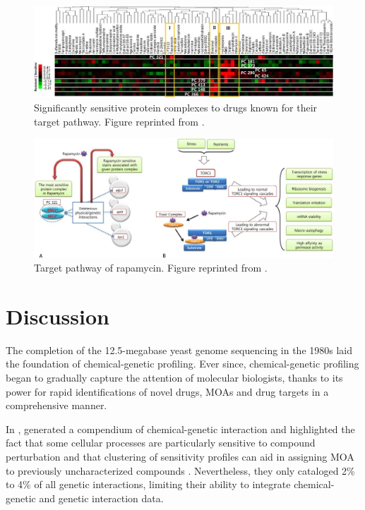 \documentclass[12pt,fullpage,singlespace]{article}
\begin{document}
\begin{figure}
\centering
\includegraphics[width=\linewidth]{1079-4.png}
\caption{Significantly sensitive protein complexes to drugs known for their target pathway. Figure reprinted from \citep{1079}.}
\label{fig:1079-4}
\end{figure}

\begin{figure}
\centering
\includegraphics[width=\linewidth]{1079-5.png}
\caption{Target pathway of rapamycin. Figure reprinted from \citep{1079}.}
\label{fig:1079-5}
\end{figure}

\section{Discussion}

The completion of the 12.5-megabase yeast genome sequencing in the 1980s laid the foundation of chemical-genetic profiling. Ever since, chemical-genetic profiling began to gradually capture the attention of molecular biologists, thanks to its power for rapid identifications of novel drugs, MOAs and drug targets in a comprehensive manner.

In \citeyear{1078},  generated a compendium of chemical-genetic interaction and highlighted the fact that some cellular processes are particularly sensitive to compound perturbation and that clustering of sensitivity profiles can aid in assigning MOA to previously uncharacterized compounds \citep{1078}. Nevertheless, they only cataloged 2\% to 4\% of all genetic interactions, limiting their ability to integrate chemical-genetic and genetic interaction data.
\end{document}
